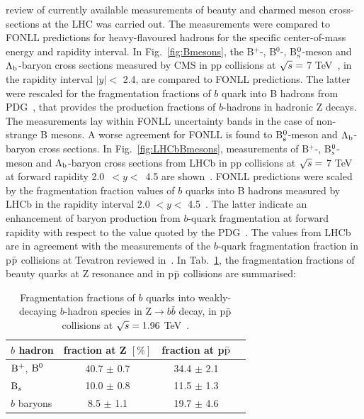 review of currently available measurements of beauty and 
charmed meson cross-sections at the LHC was carried out. The measurements 
were compared to FONLL predictions for heavy-flavoured hadrons 
for the specific center-of-mass energy and rapidity interval.
In Fig.~\ref{fig:Bmesons}, the B$^{+}$-, B$^{0}$-, B$^0_{\rm s}$-meson and 
$\Lambda_{\rm b}$-baryon cross sections measured by CMS in pp collisions 
at $\sqrt{s} = $ 7 TeV~\cite{Khachatryan:2011mk,Chatrchyan:2011pw,Chatrchyan:2011vh,Chatrchyan:2012xg},
in the rapidity interval $|y| <$ 2.4, are compared to FONLL predictions. 
The latter were rescaled for the fragmentation fractions of $b$ quark into 
B hadrons from PDG~\cite{Agashe:2014kda}, that provides the production 
fractions of $b$-hadrons in hadronic Z decays.
The measurements lay within FONLL uncertainty bands in the case 
of non-strange B mesons. A worse agreement for FONLL is found to B$^0_{\rm s}$-meson
and $\Lambda_{\rm b}$-baryon cross sections.
In Fig.~\ref{fig:LHCbBmesons}, measurements of B$^{+}$-, B$^0_{\rm s}$-meson
and $\Lambda_{\rm b}$-baryon cross sections from
LHCb in pp collisions at $\sqrt{s} =$ 7 TeV at forward rapidity 
\mbox{2.0 $< y <$ 4.5} are shown~\cite{Aaij:2013noa,Aaij:2015fea}.
FONLL predictions were scaled by the fragmentation fraction values 
of $b$ quarks into B hadrons measured by LHCb in the rapidity interval 
2.0 $< y <$ 4.5~\cite{Aaij:2011jp}. The latter indicate an 
enhancement of baryon production from $b$-quark fragmentation at forward rapidity with respect to 
the value quoted by the PDG~\cite{Patrignani:2016xqp}. The values from LHCb are in agreement with the measurements
of the $b$-quark fragmentation fraction in p$\bar{\rm p}$ collisions at Tevatron reviewed in~\cite{Patrignani:2016xqp}.
In Tab.~\ref{tab:fragFrac}, the fragmentation fractions of beauty quarks at Z resonance and
in p$\bar{\rm p}$ collisions are summarised:\\
\begin{table}[!h]
\centering
\begin{tabular}{l|ccc}
 \hline 
\hline
$b$ hadron & fraction at Z $[\%]$  & fraction at p$\bar{\rm p}$ \\
\hline 
${\rm B}^{+}$, ${\rm B}^{0}$    &     40.7 $\pm$ 0.7   & 34.4 $\pm$ 2.1 \\
${\rm B}_{s}$                 &     10.0 $\pm$ 0.8   & 11.5 $\pm$ 1.3 \\
$b$ baryons          &       8.5 $\pm$ 1.1   & 19.7 $\pm$ 4.6 \\
 \hline 
\hline
\end{tabular}
\caption{Fragmentation fractions of $b$ quarks into weakly-decaying $b$-hadron species in Z$ \rightarrow b\bar{b}$ decay, in p$\bar{\rm p}$ collisions at $\sqrt{s} = 1.96$ TeV~\cite{Patrignani:2016xqp}.}
\label{tab:fragFrac}
\end{table}




